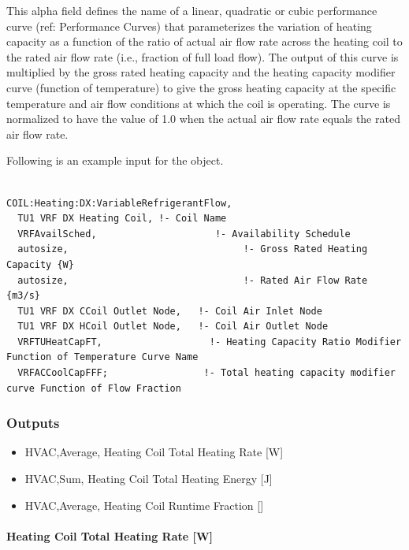 This alpha field defines the name of a linear, quadratic or cubic performance curve (ref: Performance Curves) that parameterizes the variation of heating capacity as a function of the ratio of actual air flow rate across the heating coil to the rated air flow rate (i.e., fraction of full load flow). The output of this curve is multiplied by the gross rated heating capacity and the heating capacity modifier curve (function of temperature) to give the gross heating capacity at the specific temperature and air flow conditions at which the coil is operating. The curve is normalized to have the value of 1.0 when the actual air flow rate equals the rated air flow rate.

Following is an example input for the object.

\begin{lstlisting}

COIL:Heating:DX:VariableRefrigerantFlow,
  TU1 VRF DX Heating Coil, !- Coil Name
  VRFAvailSched,                     !- Availability Schedule
  autosize,                               !- Gross Rated Heating Capacity {W}
  autosize,                               !- Rated Air Flow Rate {m3/s}
  TU1 VRF DX CCoil Outlet Node,   !- Coil Air Inlet Node
  TU1 VRF DX HCoil Outlet Node,   !- Coil Air Outlet Node
  VRFTUHeatCapFT,                   !- Heating Capacity Ratio Modifier Function of Temperature Curve Name
  VRFACCoolCapFFF;                 !- Total heating capacity modifier curve Function of Flow Fraction
\end{lstlisting}

\subsubsection{Outputs}\label{outputs-6-003}

\begin{itemize}
\item
  HVAC,Average, Heating Coil Total Heating Rate {[}W{]}
\item
  HVAC,Sum, Heating Coil Total Heating Energy {[}J{]}
\item
  HVAC,Average, Heating Coil Runtime Fraction {[]}
\end{itemize}

\paragraph{Heating Coil Total Heating Rate {[}W{]}}\label{heating-coil-total-heating-rate-w}

